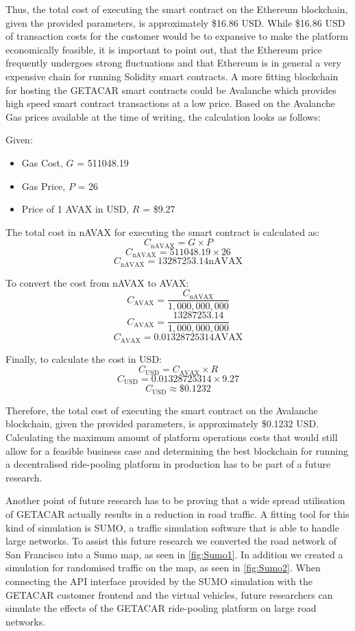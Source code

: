 Thus, the total cost of executing the smart contract on the Ethereum blockchain, given the provided parameters, is approximately \$16.86 USD. While \$16.86 USD of transaction costs for the customer would be to expansive to make the platform economically feasible, it is important to point out, that the Ethereum price frequently undergoes strong fluctuations and that Ethereum is in general a very expensive chain for running Solidity smart contracts. A more fitting blockchain for hosting the GETACAR smart contracts could be Avalanche which provides high speed smart contract transactions at a low price. Based on the Avalanche Gas prices available at the time of writing, the calculation looks as follows:

Given:
\begin{itemize}
    \item Gas Cost, \( G \) = 511048.19
    \item Gas Price, \( P \) = 26 
    \item Price of 1 AVAX in USD, \( R \) = \$9.27
\end{itemize}

The total cost in nAVAX for executing the smart contract is calculated as:
\[ C_{\text{nAVAX}} = G \times P \]
\[ C_{\text{nAVAX}} = 511048.19 \times 26 \]
\[ C_{\text{nAVAX}} = 13287253.14 \text{nAVAX} \]

To convert the cost from nAVAX to AVAX:
\[ C_{\text{AVAX}} = \frac{C_{\text{nAVAX}}}{1,000,000,000} \]
\[ C_{\text{AVAX}} = \frac{13287253.14}{1,000,000,000} \]
\[ C_{\text{AVAX}} = 0.01328725314 \text{AVAX} \]

Finally, to calculate the cost in USD:
\[ C_{\text{USD}} = C_{\text{AVAX}} \times R \]
\[ C_{\text{USD}} = 0.01328725314 \times 9.27 \]
\[ C_{\text{USD}} \approx \$0.1232 \]

Therefore, the total cost of executing the smart contract on the Avalanche blockchain, given the provided parameters, is approximately \$0.1232 USD. Calculating the maximum amount of platform operations costs that would still allow for a feasible business case and determining the best blockchain for running a decentralised ride-pooling platform in production has to be part of a future research. 

Another point of future research has to be proving that a wide spread utilisation of GETACAR actually results in a reduction in road traffic. A fitting tool for this kind of simulation is SUMO, a  traffic simulation software that is able to handle large networks. To assist this future research we converted the road network of San Francisco into a Sumo map, as seen in \ref{fig:Sumo1}. In addition we created a simulation for randomised traffic on the map, as seen in \ref{fig:Sumo2}. When connecting the API interface provided by the SUMO simulation with the GETACAR customer frontend and the virtual vehicles, future researchers can simulate the effects of the GETACAR ride-pooling platform on large road networks.

